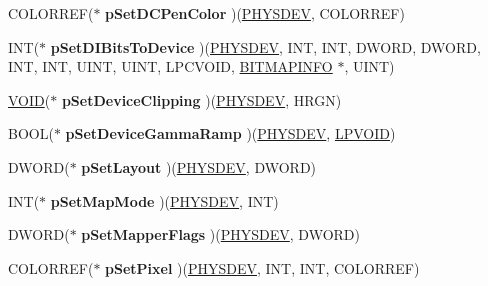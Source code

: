 \begin{DoxyCompactItemize}
C\+O\+L\+O\+R\+R\+EF($\ast$ {\bfseries p\+Set\+D\+C\+Pen\+Color} )(\hyperlink{structgdi__physdev}{P\+H\+Y\+S\+D\+EV}, C\+O\+L\+O\+R\+R\+EF)
\item 
\mbox{\label{structgdi__dc__funcs_a7e67bdc7e30096abfe94c6ac5055487a}} 
I\+NT($\ast$ {\bfseries p\+Set\+D\+I\+Bits\+To\+Device} )(\hyperlink{structgdi__physdev}{P\+H\+Y\+S\+D\+EV}, I\+NT, I\+NT, D\+W\+O\+RD, D\+W\+O\+RD, I\+NT, I\+NT, U\+I\+NT, U\+I\+NT, L\+P\+C\+V\+O\+ID, \hyperlink{structtag_b_i_t_m_a_p_i_n_f_o}{B\+I\+T\+M\+A\+P\+I\+N\+FO} $\ast$, U\+I\+NT)
\item 
\mbox{\label{structgdi__dc__funcs_a8e80920e0cfaef8547f999f88fb4e6de}} 
\hyperlink{interfacevoid}{V\+O\+ID}($\ast$ {\bfseries p\+Set\+Device\+Clipping} )(\hyperlink{structgdi__physdev}{P\+H\+Y\+S\+D\+EV}, H\+R\+GN)
\item 
\mbox{\label{structgdi__dc__funcs_a517d3724c108ba6ddce101f11df899f9}} 
B\+O\+OL($\ast$ {\bfseries p\+Set\+Device\+Gamma\+Ramp} )(\hyperlink{structgdi__physdev}{P\+H\+Y\+S\+D\+EV}, \hyperlink{interfacevoid}{L\+P\+V\+O\+ID})
\item 
\mbox{\label{structgdi__dc__funcs_a7681689a823cf8de2aaab2c82562318c}} 
D\+W\+O\+RD($\ast$ {\bfseries p\+Set\+Layout} )(\hyperlink{structgdi__physdev}{P\+H\+Y\+S\+D\+EV}, D\+W\+O\+RD)
\item 
\mbox{\label{structgdi__dc__funcs_a8ddd9e880a0cdc113a13874aa7af35d6}} 
I\+NT($\ast$ {\bfseries p\+Set\+Map\+Mode} )(\hyperlink{structgdi__physdev}{P\+H\+Y\+S\+D\+EV}, I\+NT)
\item 
\mbox{\label{structgdi__dc__funcs_a5b423f03a27866c8145fd8a29d4e4401}} 
D\+W\+O\+RD($\ast$ {\bfseries p\+Set\+Mapper\+Flags} )(\hyperlink{structgdi__physdev}{P\+H\+Y\+S\+D\+EV}, D\+W\+O\+RD)
\item 
\mbox{\label{structgdi__dc__funcs_aa67a73233a46a30b9cc6142d3d7f1ab4}} 
C\+O\+L\+O\+R\+R\+EF($\ast$ {\bfseries p\+Set\+Pixel} )(\hyperlink{structgdi__physdev}{P\+H\+Y\+S\+D\+EV}, I\+NT, I\+NT, C\+O\+L\+O\+R\+R\+EF)
\item 
\mbox{\label{structgdi__dc__funcs_ab28206fa3aff0f253965fefd77c21e4e}} 

\end{DoxyCompactItemize}
